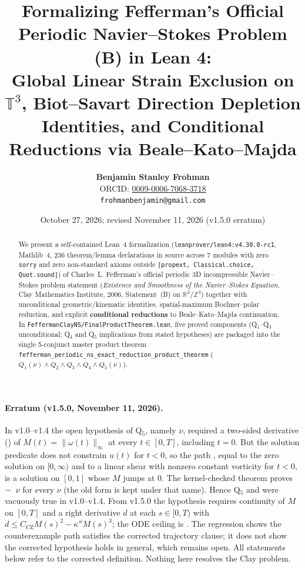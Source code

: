 \documentclass[11pt,a4paper]{article}
\title{\textbf{Formalizing Fefferman's Official Periodic Navier--Stokes Problem (B) in Lean 4:\\
Global Linear Strain Exclusion on $\mathbb{T}^3$, Biot--Savart Direction Depletion Identities, and Conditional Reductions via Beale--Kato--Majda}}
\author{\textbf{Benjamin Stanley Frohman}\\
ORCID: \href{https://orcid.org/0009-0006-7068-3718}{0009-0006-7068-3718}\\
\texttt{frohmanbenjamin@gmail.com}}
\date{October 27, 2026; revised November 11, 2026 (v1.5.0 erratum)}
\theoremstyle{definition}
\begin{document}
\maketitle

\begin{abstract}
We present a self-contained Lean~4 formalization (\texttt{leanprover/lean4:v4.30.0-rc1}, Mathlib~4, 236 theorem/lemma declarations in source across 7 modules with zero \texttt{sorry} and zero non-standard axioms outside \texttt{[propext, Classical.choice, Quot.sound]}) of Charles~L. Fefferman's official periodic 3D incompressible Navier--Stokes problem statement (\emph{Existence and Smoothness of the Navier--Stokes Equation}, Clay Mathematics Institute, 2006, Statement~(B) on $\mathbb{R}^3/\mathbb{Z}^3$) together with unconditional geometric/kinematic identities, spatial-maximum Bochner--polar reduction, and explicit \textbf{conditional reductions} to Beale--Kato--Majda continuation. In \texttt{FeffermanClayNS/FinalProductTheorem.lean}, five proved components (Q$_1$--Q$_3$ unconditional; Q$_4$ and Q$_5$ implications from stated hypotheses) are packaged into the single 5-conjunct master product theorem \texttt{fefferman\_periodic\_ns\_exact\_reduction\_product\_theorem} ($Q_1(\nu) \wedge Q_2 \wedge Q_3 \wedge Q_4 \wedge Q_5(\nu)$).
\end{abstract}

{\sloppy\renewcommand{\UrlBreaks}{\do\_\do\.}\paragraph{Erratum (v1.5.0, November 11, 2026).} In v1.0--v1.4 the open hypothesis of Q$_5$, namely  $\nu$, required a two-sided derivative () of $M(t)=\|\omega(t)\|_\infty$ at every $t\in[0,T]$, including $t=0$. But the solution predicate  does not constrain $u(t)$ for $t<0$, so the path , equal to the zero solution on $[0,\infty)$ and to a linear shear with nonzero constant vorticity for $t<0$, is a solution on $[0,1]$ whose $M$ jumps at $0$. The kernel-checked theorem  proves $\neg$\,~$\nu$ for every $\nu$ (the old form is kept under that name). Hence Q$_5$ and  were vacuously true in v1.0--v1.4. From v1.5.0 the hypothesis requires continuity of $M$ on $[0,T]$ and a right derivative $d$ at each $s\in[0,T)$ with $d\le C_{\mathrm{CZ}}M(s)^2-\kappa''M(s)^3$; the ODE ceiling is . The regression  shows the counterexample path satisfies the corrected trajectory clause; it does not show the corrected hypothesis holds in general, which remains open. All statements below refer to the corrected definition. Nothing here resolves the Clay problem.\par}
\end{document}
